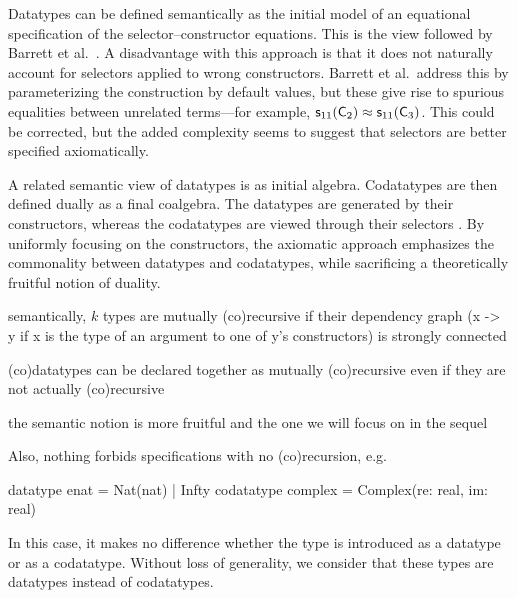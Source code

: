 


Datatypes can be defined semantically as the initial model of an equational
specification of the selector--constructor equations. This is the view followed
by Barrett et al.\ \cite{barrett-et-al-2010}. A disadvantage with this approach
is that it does not naturally account for selectors applied to wrong
constructors. Barrett et al.\ address this by parameterizing the construction by
default values, but these give rise to spurious equalities between unrelated
terms---for example, $\textsf{s}_{11}(\textsf{C}_2) \approx \textsf{s}_{11}(\textsf{C}_3)$.
This could be corrected, but the added
complexity seems to suggest that selectors are better specified axiomatically.

A related semantic view of datatypes is as initial algebra. Codatatypes are then
defined dually as a final coalgebra. The datatypes are generated by their
constructors, whereas the codatatypes are viewed through their selectors
\cite{xxx}. By uniformly focusing on the constructors, the axiomatic approach
emphasizes the commonality between datatypes and codatatypes, while sacrificing
a theoretically fruitful notion of duality.


    semantically, $k$ types are mutually (co)recursive if their dependency graph
    (x -> y if x is the type of an argument to one of y's constructors) is
    strongly connected

    (co)datatypes can be declared together as mutually (co)recursive even if
    they are not actually (co)recursive

    the semantic notion is more fruitful and the one we will focus on in the
    sequel

    Also, nothing forbids specifications with no (co)recursion, e.g.

      datatype enat = Nat(nat) | Infty
      codatatype complex = Complex(re: real, im: real)

    In this case, it makes no difference whether the type is introduced as a
    datatype or as a codatatype. Without loss of generality, we consider that
    these types are datatypes instead of codatatypes.


